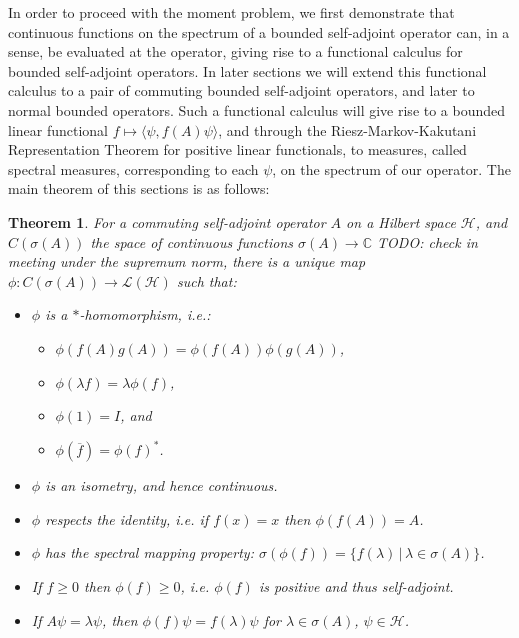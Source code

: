 \documentclass[12pt,oneside]{report}
\newtheorem{thm}{Theorem}[chapter]
\begin{document}
In order to proceed with the moment problem, we first demonstrate that continuous functions on the spectrum of a bounded self-adjoint operator can, in a sense, be evaluated at the operator, giving rise to a functional calculus for bounded self-adjoint operators. In later sections we will extend this functional calculus to a pair of commuting bounded self-adjoint operators, and later to normal bounded operators. Such a functional calculus will give rise to a bounded linear functional $f \mapsto \langle \psi, f(A) \psi \rangle$, and through the Riesz-Markov-Kakutani Representation Theorem for positive linear functionals, to measures, called spectral measures, corresponding to each $\psi$, on the spectrum of our operator. The main theorem of this sections is as follows:

\begin{thm}
    For a commuting self-adjoint operator $A$ on a Hilbert space $\mathscr{H}$, and $C(\sigma(A))$ the space of continuous functions $\sigma(A) \to \mathbb{C}$ TODO: check in meeting under the supremum norm, there is a unique map $\phi: C(\sigma(A)) \to \mathscr{L}(\mathscr{H})$ such that:
    \begin{itemize}
        \item $\phi$ is a $*$-homomorphism, i.e.:
        \begin{itemize}
            \item $\phi(f(A)g(A)) = \phi(f(A))\phi(g(A))$,
            \item $\phi(\lambda f) = \lambda \phi(f)$,
            \item $\phi(1) = I$, and
            \item $\phi(\overline{f}) = \phi(f)^{*}$.
        \end{itemize}
        \item $\phi$ is an isometry, and hence continuous.
        \item $\phi$ respects the identity, i.e. if $f(x) = x$ then $\phi(f(A)) = A$.
        \item $\phi$ has the spectral mapping property: $\sigma(\phi(f)) = \{ f(\lambda) \, | \, \lambda \in \sigma(A) \}$.
        \item If $f \geq 0$ then $\phi(f) \geq 0$, i.e. $\phi(f)$ is positive and thus self-adjoint.
        \item If $A\psi = \lambda \psi$, then $\phi(f)\psi = f(\lambda)\psi$ for $\lambda \in \sigma(A)$, $\psi \in \mathscr{H}$.
    \end{itemize}
\end{thm}
\end{document}

